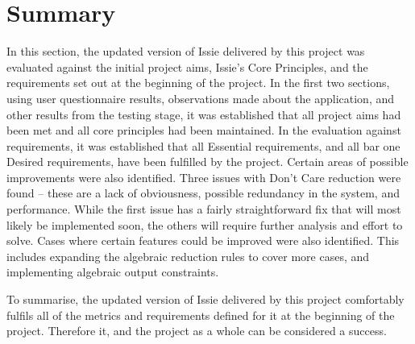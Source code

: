 

\section{Summary}
In this section, the updated version of Issie delivered by this project was evaluated against the initial project aims, Issie's Core Principles, and the requirements set out at the beginning of the project. In the first two sections, using user questionnaire results, observations made about the application, and other results from the testing stage, it was established that all project aims had been met and all core principles had been maintained. In the evaluation against requirements, it was established that all Essential requirements, and all bar one Desired requirements, have been fulfilled by the project.
Certain areas of possible improvements were also identified. Three issues with Don't Care reduction were found -- these are a lack of obviousness, possible redundancy in the system, and performance. While the first issue has a fairly straightforward fix that will most likely be implemented soon, the others will require further analysis and effort to solve. Cases where certain features could be improved were also identified. This includes expanding the algebraic reduction rules to cover more cases, and implementing algebraic output constraints. 

To summarise, the updated version of Issie delivered by this project comfortably fulfils all of the metrics and requirements defined for it at the beginning of the project. Therefore it, and the project as a whole can be considered a success.


